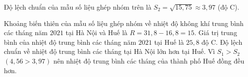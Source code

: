 \begin{ex}
{\begin{itemize}
\begin{itemize}
				Độ lệch chuẩn của mẫu số liệu ghép nhóm trên là $S_2 = \sqrt{15{,}75} \approx 3{,}97$ (độ C).
			\end{itemize}
		\end{itemize}
		\begin{itemchoice}
			\itemch Khoảng biến thiên của mẫu số liệu ghép nhóm về nhiệt độ không khí trung bình các tháng năm $2021$ tại Hà Nội và Huế là $R = 31{,}8 - 16{,}8 = 15$.
			\itemch Giá trị trung bình của nhiệt độ trung bình các tháng năm $2021$ tại Huế là $25{,}8$ độ C.
			\itemch Độ lệch chuẩn về nhiệt độ trung bình các tháng tại Hà Nội lớn hơn tại Huế.
			\itemch Vì $S_1 > S_2$ $(4{,}56 > 3{,}97)$ nên nhiệt độ trung bình các tháng của thành phố Huế đồng đều hơn.
		\end{itemchoice}
	}
\end{ex}

